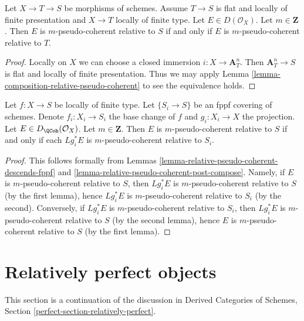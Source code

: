 \begin{lemma}
\label{lemma-relative-pseudo-coherent-post-compose}
Let $X \to T \to S$ be morphisms of schemes. Assume $T \to S$
is flat and locally of finite presentation and $X \to T$
locally of finite type. Let $E \in D(\mathcal{O}_X)$. Let $m \in \mathbf{Z}$.
Then $E$ is $m$-pseudo-coherent relative to $S$
if and only if $E$ is $m$-pseudo-coherent relative to $T$.
\end{lemma}

\begin{proof}
Locally on $X$ we can choose a closed immersion $i : X \to \mathbf{A}^n_T$.
Then $\mathbf{A}^n_T \to S$ is flat and locally of finite presentation.
Thus we may
apply Lemma \ref{lemma-composition-relative-pseudo-coherent}
to see the equivalence holds.
\end{proof}

\begin{lemma}
\label{lemma-relative-pseudo-coherent-descends-fppf-base}
Let $f : X \to S$ be locally of finite type.
Let $\{S_i \to S\}$ be an fppf covering of schemes.
Denote $f_i : X_i \to S_i$ the base change of $f$
and $g_i : X_i \to X$ the projection.
Let $E \in D_\QCoh(\mathcal{O}_X)$. Let $m \in \mathbf{Z}$.
Then $E$ is $m$-pseudo-coherent relative to $S$
if and only if each $Lg_i^*E$ is $m$-pseudo-coherent relative to $S_i$.
\end{lemma}

\begin{proof}
This follows formally from
Lemmas \ref{lemma-relative-pseudo-coherent-descends-fppf} and
\ref{lemma-relative-pseudo-coherent-post-compose}.
Namely, if $E$ is $m$-pseudo-coherent relative to $S$,
then $Lg_i^*E$ is $m$-pseudo-coherent relative to $S$ (by the first lemma),
hence $Lg_i^*E$ is $m$-pseudo-coherent relative to $S_i$ (by the second).
Conversely, if
$Lg_i^*E$ is $m$-pseudo-coherent relative to $S_i$, then
$Lg_i^*E$ is $m$-pseudo-coherent relative to $S$ (by the second lemma),
hence $E$ is $m$-pseudo-coherent relative to $S$ (by the first lemma).
\end{proof}






\section{Relatively perfect objects}
\label{section-relatively-perfect}

\noindent
This section is a continuation of the discussion in
Derived Categories of Schemes, Section
\ref{perfect-section-relatively-perfect}.

